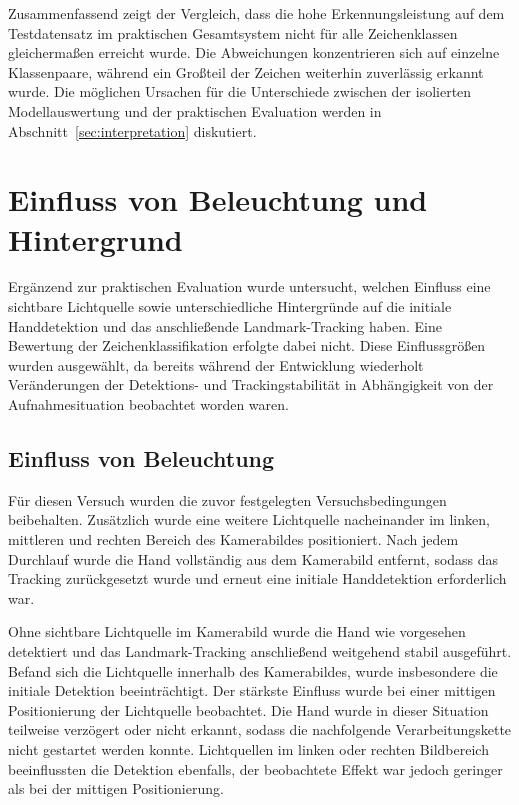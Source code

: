 Zusammenfassend zeigt der Vergleich, dass die hohe Erkennungsleistung auf dem Testdatensatz im praktischen Gesamtsystem nicht für alle Zeichenklassen gleichermaßen 
erreicht wurde. Die Abweichungen konzentrieren sich auf einzelne Klassenpaare, während ein
Großteil der Zeichen weiterhin zuverlässig erkannt wurde. Die möglichen Ursachen für die 
Unterschiede zwischen der isolierten Modellauswertung und der praktischen Evaluation werden in Abschnitt~\ref{sec:interpretation} diskutiert.

\section{Einfluss von Beleuchtung und Hintergrund}\label{sec:beleuchtunghintergrund}
Ergänzend zur praktischen Evaluation wurde untersucht, welchen Einfluss eine sichtbare Lichtquelle sowie unterschiedliche Hintergründe auf die initiale Handdetektion und das anschließende Landmark-Tracking haben. Eine Bewertung der Zeichenklassifikation erfolgte dabei nicht. Diese Einflussgrößen wurden ausgewählt, da bereits während der Entwicklung wiederholt Veränderungen der Detektions- und Trackingstabilität in Abhängigkeit von der Aufnahmesituation beobachtet worden waren.

\subsection{Einfluss von Beleuchtung}\label{sec:beleuchtung}

Für diesen Versuch wurden die zuvor festgelegten Versuchsbedingungen beibehalten. Zusätzlich wurde eine weitere Lichtquelle nacheinander im linken, mittleren und rechten Bereich des Kamerabildes positioniert. Nach jedem Durchlauf wurde die Hand vollständig aus dem Kamerabild entfernt, sodass das Tracking zurückgesetzt wurde und erneut eine initiale Handdetektion erforderlich war.

Ohne sichtbare Lichtquelle im Kamerabild wurde die Hand wie vorgesehen detektiert und das Landmark-Tracking anschließend weitgehend stabil ausgeführt. Befand sich die Lichtquelle innerhalb des Kamerabildes, wurde insbesondere die initiale Detektion beeinträchtigt. Der stärkste Einfluss wurde bei einer mittigen Positionierung der Lichtquelle beobachtet. Die Hand wurde in dieser Situation teilweise verzögert oder nicht erkannt, sodass die nachfolgende Verarbeitungskette nicht gestartet werden konnte. Lichtquellen im linken oder rechten Bildbereich beeinflussten die Detektion ebenfalls, der beobachtete Effekt war jedoch geringer als bei der mittigen Positionierung.

